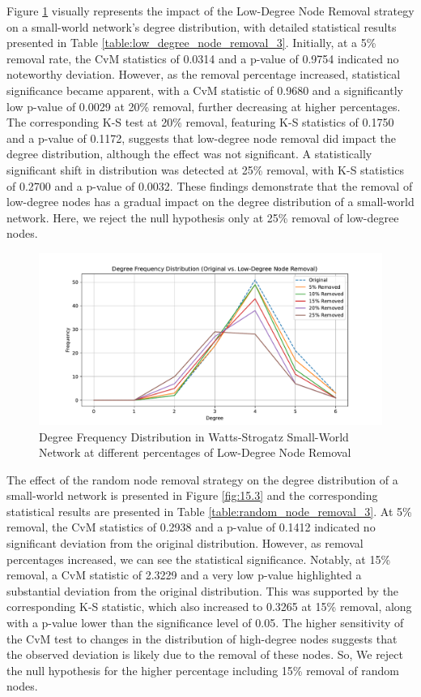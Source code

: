 \documentclass[conference]{IEEEtran} %
\begin{document}
Figure \ref{fig:15.2} visually represents the impact of the Low-Degree Node Removal strategy on a small-world network's degree distribution, with detailed statistical results presented in Table \ref{table:low_degree_node_removal_3}. Initially, at a 5\% removal rate, the CvM statistics of 0.0314 and a p-value of 0.9754 indicated no noteworthy deviation. However, as the removal percentage increased, statistical significance became apparent, with a CvM statistic of 0.9680 and a significantly low p-value of 0.0029 at 20\% removal, further decreasing at higher percentages. The corresponding K-S test at 20\% removal, featuring K-S statistics of 0.1750 and a p-value of 0.1172, suggests that low-degree node removal did impact the degree distribution, although the effect was not significant. A statistically significant shift in distribution was detected at 25\% removal, with K-S statistics of 0.2700 and a p-value of 0.0032. These findings demonstrate that the removal of low-degree nodes has a gradual impact on the degree distribution of a small-world network. Here, we reject the null hypothesis only at 25\% removal of low-degree nodes.

\begin{figure}[t]
  \centering
  \includegraphics[width=1.1\linewidth]{small_world_network_frequency_distribution_plot_Low-Degree Node Removal.pdf}
  \caption{Degree Frequency Distribution in Watts-Strogatz Small-World Network at different percentages of Low-Degree Node Removal}
  \label{fig:15.2}
\end{figure}

The effect of the random node removal strategy on the degree distribution of a small-world network is presented in Figure \ref{fig:15.3} and the corresponding statistical results are presented in Table \ref{table:random_node_removal_3}. At 5\% removal, the CvM statistics of 0.2938 and a p-value of 0.1412 indicated no significant deviation from the original distribution. However, as removal percentages increased, we can see the statistical significance. Notably, at 15\% removal, a CvM statistic of 2.3229 and a very low p-value highlighted a substantial deviation from the original distribution. This was supported by the corresponding K-S statistic, which also increased to 0.3265 at 15\% removal, along with a p-value lower than the significance level of 0.05. The higher sensitivity of the CvM test to changes in the distribution of high-degree nodes suggests that the observed deviation is likely due to the removal of these nodes. So, We reject the null hypothesis for the higher percentage including 15\% removal of random nodes.
\end{document}
